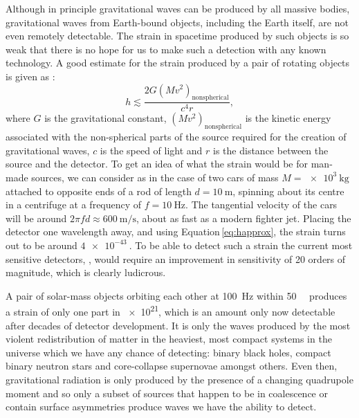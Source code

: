 Although in principle gravitational waves can be produced by all massive bodies, gravitational waves from Earth-bound objects, including the Earth itself, are not even remotely detectable. The strain in spacetime produced by such objects is so weak that there is no hope for us to make such a detection with any known technology. A good estimate for the strain produced by a pair of rotating objects is given as \cite{Sathyaprakash2009}:
\begin{equation}
  \label{eq:happrox}
  h \lesssim \frac{2 G \left( M v^{2} \right)_{\text{nonspherical}}}{c^4 r},
\end{equation}
where $G$ is the gravitational constant, $\left( M v^{2} \right)_{\text{nonspherical}}$ is the kinetic energy associated with the non-spherical parts of the source required for the creation of gravitational waves, $c$ is the speed of light and $r$ is the distance between the source and the detector. To get an idea of what the strain would be for man-made sources, we can consider as in \cite{Sathyaprakash2009} the case of two cars of mass $M = \SI{e3}{\kilo\gram}$ attached to opposite ends of a rod of length $d = \SI{10}{\meter}$, spinning about its centre in a centrifuge at a frequency of $f = \SI{10}{\hertz}$. The tangential velocity of the cars will be around $2 \pi f d \approx \SI{600}{\meter\per\second}$, about as fast as a modern fighter jet. Placing the detector one wavelength away, and using Equation\,\ref{eq:happrox}, the strain turns out to be around $\SI{4e-43}{}$. To be able to detect such a strain the current most sensitive detectors, \ALIGO{}, would require an improvement in sensitivity of \SI{20}{} orders of magnitude, which is clearly ludicrous.

A pair of solar-mass objects orbiting each other at \SI{100}{\hertz} within \SI{50}{\mega\lightyear} produces a strain of only one part in \SI{e21}{}, which is an amount only now detectable after decades of detector development. It is only the waves produced by the most violent redistribution of matter in the heaviest, most compact systems in the universe which we have any chance of detecting: binary black holes, compact binary neutron stars and core-collapse supernovae amongst others. Even then, gravitational radiation is only produced by the presence of a changing quadrupole moment and so only a subset of sources that happen to be in coalescence or contain surface asymmetries produce waves we have the ability to detect.

